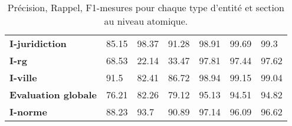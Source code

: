 \begin{table}[!h]
\begin{tabular}{|l|l|l|l|l|l|l|}
		\textbf{I-juridiction} & 85.15              & 98.37           & 91.28       & 98.91              & 99.69           & 99.3        \\ 
		\textbf{I-rg}          & 68.53              & 22.14           & 33.47       & 97.81              & 97.44           & 97.62       \\ 
		\textbf{I-ville}       & 91.5               & 82.41           & 86.72       & 98.94              & 99.15           & 99.04       \\ \hline
		\textbf{Evaluation globale}       & 76.21              & 82.26           & 79.12       & 95.13              & 94.51           & 94.82       \\ \hline
		\noalign{\smallskip}\hline\noalign{\smallskip}
		\textbf{I-norme}       & 88.23              & 93.7            & 90.89       & 97.14              & 96.09           & 96.62       \\ \hline
	\end{tabular}
	\caption{Précision, Rappel, F1-mesures pour chaque type d'entité et section au niveau atomique.}\label{tab:structuration:perf-detail-token}
\end{table}


